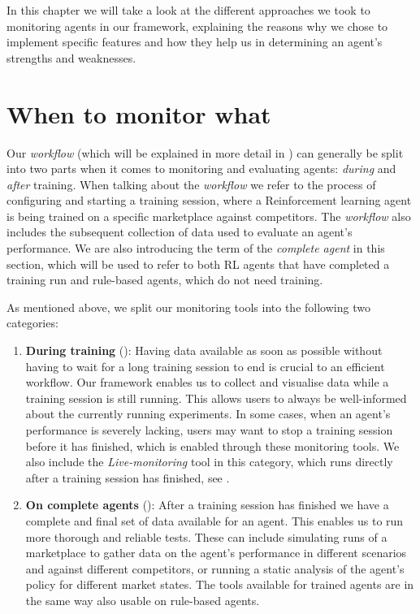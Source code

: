\begin{jointwork}\label{ch:Approaches}
	In this chapter we will take a look at the different approaches we took to monitoring agents in our framework, explaining the reasons why we chose to implement specific features and how they help us in determining an agent's strengths and weaknesses.
\end{jointwork}

\section{When to monitor what}\label{sec:WhenToMonitorWhat}

Our \emph{workflow} (which will be explained in more detail in ) can generally be split into two parts when it comes to monitoring and evaluating agents: \emph{during} and \emph{after} training. When talking about the \emph{workflow} we refer to the process of configuring and starting a training session, where a Reinforcement learning agent is being trained on a specific marketplace against competitors. The \emph{workflow} also includes the subsequent collection of data used to evaluate an agent's performance. We are also introducing the term of the \emph{complete agent} in this section, which will be used to refer to both RL agents that have completed a training run and rule-based agents, which do not need training.

As mentioned above, we split our monitoring tools into the following two categories:

\begin{enumerate}
	\item \textbf{During training} (): Having data available as soon as possible without having to wait for a long training session to end is crucial to an efficient workflow. Our framework enables us to collect and visualise data while a training session is still running. This allows users to always be well-informed about the currently running experiments. In some cases, when an agent's performance is severely lacking, users may want to stop a training session before it has finished, which is enabled through these monitoring tools. We also include the \emph{Live-monitoring} tool in this category, which runs directly after a training session has finished, see .

	\item \textbf{On complete agents} (): After a training session has finished we have a complete and final set of data available for an agent. This enables us to run more thorough and reliable tests. These can include simulating runs of a marketplace to gather data on the agent's performance in different scenarios and against different competitors, or running a static analysis of the agent's policy for different market states. The tools available for trained agents are in the same way also usable on rule-based agents.
\end{enumerate}

